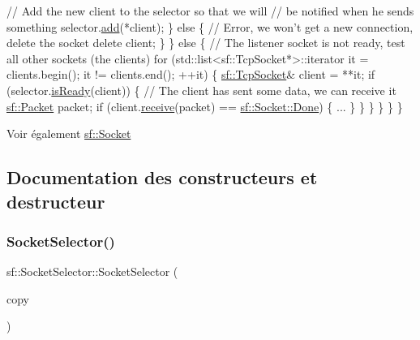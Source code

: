 \begin{DoxyCode}
                \textcolor{comment}{// Add the new client to the selector so that we will}
                \textcolor{comment}{// be notified when he sends something}
                selector.\hyperlink{classsf_1_1SocketSelector_ade952013232802ff7b9b33668f8d2096}{add}(*client);
            \}
            \textcolor{keywordflow}{else}
            \{
                \textcolor{comment}{// Error, we won't get a new connection, delete the socket}
                \textcolor{keyword}{delete} client;
            \}
        \}
        \textcolor{keywordflow}{else}
        \{
            \textcolor{comment}{// The listener socket is not ready, test all other sockets (the clients)}
            \textcolor{keywordflow}{for} (std::list<sf::TcpSocket*>::iterator it = clients.begin(); it != clients.end(); ++it)
            \{
                \hyperlink{classsf_1_1TcpSocket}{sf::TcpSocket}& client = **it;
                \textcolor{keywordflow}{if} (selector.\hyperlink{classsf_1_1SocketSelector_a917a4bac708290a6782e6686fd3bf889}{isReady}(client))
                \{
                    \textcolor{comment}{// The client has sent some data, we can receive it}
                    \hyperlink{classsf_1_1Packet}{sf::Packet} packet;
                    \textcolor{keywordflow}{if} (client.\hyperlink{classsf_1_1TcpSocket_a90ce50811ea61d4f00efc62bb99ae1af}{receive}(packet) == \hyperlink{classsf_1_1Socket_a51bf0fd51057b98a10fbb866246176dca1de3a85bc56d3ae85b3d0f3cfd04ae90}{sf::Socket::Done})
                    \{
                        ...
                    \}
                \}
            \}
        \}
    \}
\}
\end{DoxyCode}


\begin{DoxySeeAlso}{Voir également}
\hyperlink{classsf_1_1Socket}{sf\+::\+Socket} 
\end{DoxySeeAlso}


\subsection{Documentation des constructeurs et destructeur}
\mbox{\label{classsf_1_1SocketSelector_a50b1b955eb7ecb2e7c2764f3f4722fbf}} 
\subsubsection{\texorpdfstring{Socket\+Selector()}{SocketSelector()}}
{\footnotesize\ttfamily sf\+::\+Socket\+Selector\+::\+Socket\+Selector (\begin{DoxyParamCaption}\item[{const \hyperlink{classsf_1_1SocketSelector}{Socket\+Selector} \&}]{copy }\end{DoxyParamCaption})}



